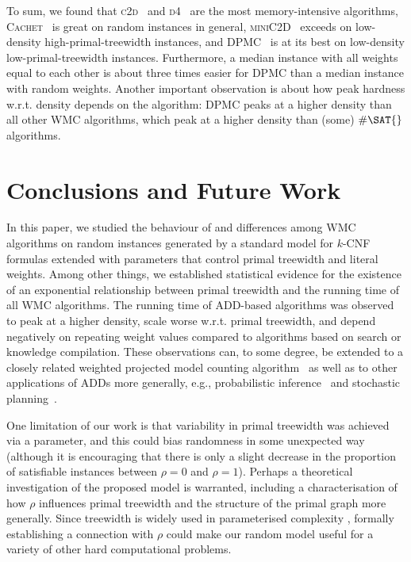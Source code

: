 \documentclass{article}
\theoremstyle{definition}
\begin{document}
To sum, we found that \textsc{c2d}~\cite{DBLP:conf/ecai/Darwiche04} and
\textsc{d4}~\cite{DBLP:conf/ijcai/LagniezM17} are the most memory-intensive
algorithms, \textsc{Cachet}~\cite{DBLP:conf/sat/SangBBKP04} is great on random
instances in general, \textsc{miniC2D}~\cite{DBLP:conf/ijcai/OztokD15} exceeds
on low-density high-primal-treewidth instances, and
\textsc{DPMC}~\cite{DBLP:conf/cp/DudekPV20} is at its best on low-density
low-primal-treewidth instances. Furthermore, a median instance with all weights
equal to each other is about three times easier for \textsc{DPMC} than a median
instance with random weights. Another important observation is about how peak
hardness w.r.t. density depends on the algorithm: \textsc{DPMC} peaks at a
higher density than all other \textsc{WMC} algorithms, which peak at a higher
density than (some) $\#\SAT{}$ algorithms.

\section{Conclusions and Future Work}

In this paper, we studied the behaviour of and differences among \textsf{WMC}
algorithms on random instances generated by a standard model for $k$-CNF
formulas extended with parameters that control primal treewidth and literal
weights. Among other things, we established statistical evidence for the
existence of an exponential relationship between primal treewidth and the
running time of all \textsf{WMC} algorithms. The running time of ADD-based
algorithms was observed to peak at a higher density, scale worse w.r.t. primal
treewidth, and depend negatively on repeating weight values compared to
algorithms based on search or knowledge compilation. These observations can, to
some degree, be extended to a closely related weighted projected model counting
algorithm~\cite{DBLP:conf/sat/DudekPV21} as well as to other applications of
ADDs more generally, e.g., probabilistic
inference~\cite{DBLP:conf/ijcai/ChaviraD07,DBLP:conf/uai/GogateD11} and
stochastic planning~\cite{DBLP:conf/uai/HoeySHB99}.

One limitation of our work is that variability in primal treewidth was achieved
via a parameter, and this could bias randomness in some unexpected way (although
it is encouraging that there is only a slight decrease in the proportion of
satisfiable instances between $\rho=0$ and $\rho = 1$). Perhaps a theoretical
investigation of the proposed model is warranted, including a characterisation
of how $\rho$ influences primal treewidth and the structure of the primal graph
more generally. Since treewidth is widely used in parameterised complexity
\cite{DBLP:series/txcs/DowneyF13}, formally establishing a connection with
$\rho$ could make our random model useful for a variety of other hard
computational problems.
\end{document}
